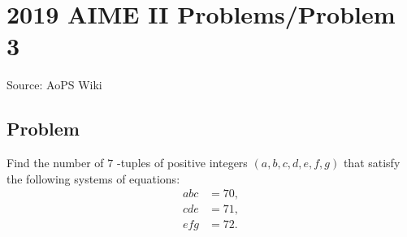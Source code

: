 \documentclass[12pt]{article}
\begin{document}
\section*{{2019 AIME II Problems/Problem 3}}
Source: AoPS Wiki

\subsection*{Problem}
Find the number of $7$ -tuples of positive integers $(a,b,c,d,e,f,g)$ that satisfy the following systems of equations: \begin{align*} abc&=70,\\ cde&=71,\\ efg&=72. \end{align*}
\end{document}
